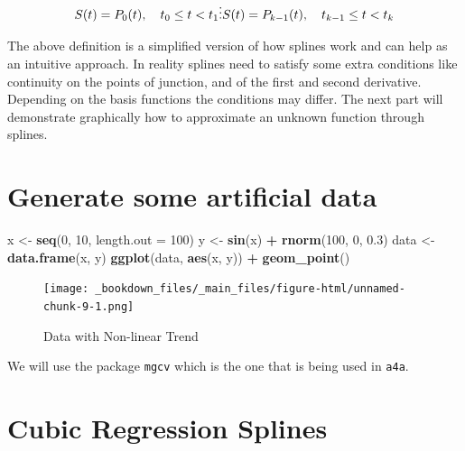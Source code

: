 \documentclass[
]{book}
\newenvironment{Shaded}{\begin{snugshade}}{\end{snugshade}}
\newcommand{\AttributeTok}[1]{\textcolor[rgb]{0.13,0.29,0.53}{#1}}
\newcommand{\DecValTok}[1]{\textcolor[rgb]{0.00,0.00,0.81}{#1}}
\newcommand{\FloatTok}[1]{\textcolor[rgb]{0.00,0.00,0.81}{#1}}
\newcommand{\FunctionTok}[1]{\textcolor[rgb]{0.13,0.29,0.53}{\textbf{#1}}}
\newcommand{\NormalTok}[1]{#1}
\newcommand{\OtherTok}[1]{\textcolor[rgb]{0.56,0.35,0.01}{#1}}
\newcommand{\SpecialCharTok}[1]{\textcolor[rgb]{0.81,0.36,0.00}{\textbf{#1}}}
\begin{document}
\[
S(t) = P_{0}(t), \quad t_{0} \leq t < t_{1} \\
\vdots \\
S(t) = P_{k-1}(t), \quad t_{k-1} \leq t < t_{k}
\]

The above definition is a simplified version of how splines work and can help as an intuitive approach. In reality splines need to satisfy some extra conditions like continuity on the points of junction, and of the first and second derivative. Depending on the basis functions the conditions may differ. The next part will demonstrate graphically how to approximate an unknown function through splines.

\hypertarget{generate-some-artificial-data}{%
\section{Generate some artificial data}\label{generate-some-artificial-data}}

\begin{Shaded}
\begin{Highlighting}[]
\NormalTok{x }\OtherTok{\textless{}{-}} \FunctionTok{seq}\NormalTok{(}\DecValTok{0}\NormalTok{, }\DecValTok{10}\NormalTok{, }\AttributeTok{length.out =} \DecValTok{100}\NormalTok{)}
\NormalTok{y }\OtherTok{\textless{}{-}} \FunctionTok{sin}\NormalTok{(x) }\SpecialCharTok{+} \FunctionTok{rnorm}\NormalTok{(}\DecValTok{100}\NormalTok{, }\DecValTok{0}\NormalTok{, }\FloatTok{0.3}\NormalTok{)}
\NormalTok{data }\OtherTok{\textless{}{-}} \FunctionTok{data.frame}\NormalTok{(x, y)}
\FunctionTok{ggplot}\NormalTok{(data, }\FunctionTok{aes}\NormalTok{(x, y)) }\SpecialCharTok{+} 
  \FunctionTok{geom\_point}\NormalTok{()}
\end{Highlighting}
\end{Shaded}

\begin{figure}
\centering
\texttt{[image: \_bookdown\_files/\_main\_files/figure-html/unnamed-chunk-9-1.png]}
\caption{\label{fig:unnamed-chunk-9}Data with Non-linear Trend}
\end{figure}

We will use the package \texttt{mgcv} which is the one that is being used in \texttt{a4a}.

\hypertarget{cubic-regression-splines}{%
\section{Cubic Regression Splines}\label{cubic-regression-splines}}
\end{document}
